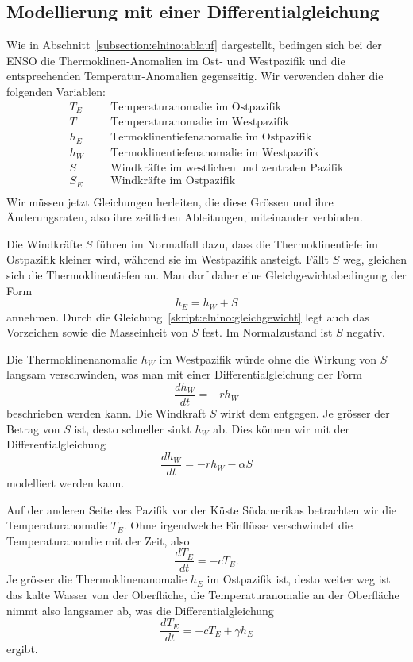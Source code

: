 \subsection{Modellierung mit einer Differentialgleichung%
\label{subsection:elnino:modellierung}}
Wie in Abschnitt~\ref{subsection:elnino:ablauf} dargestellt, bedingen sich
bei der ENSO die Thermoklinen-Anomalien im Ost- und Westpazifik und die
entsprechenden Temperatur-Anomalien gegenseitig.
Wir verwenden daher die folgenden Variablen:
\[
\begin{aligned}
T_E&&&\text{Temperaturanomalie im Ostpazifik}\\
T&&&\text{Temperaturanomalie im Westpazifik}\\
h_E&&&\text{Termoklinentiefenanomalie im Ostpazifik}\\
h_W&&&\text{Termoklinentiefenanomalie im Westpazifik}\\
S&&&\text{Windkräfte im westlichen und zentralen Pazifik}\\
S_E&&&\text{Windkräfte im Ostpazifik}\\
\end{aligned}
\]
Wir müssen jetzt Gleichungen herleiten, die diese Grössen und ihre
Änderungsraten, also ihre zeitlichen Ableitungen, miteinander verbinden.

Die Windkräfte $S$ führen im Normalfall dazu, dass die Thermoklinentiefe
im Ostpazifik kleiner wird, während sie im Westpazifik ansteigt.
Fällt $S$ weg, gleichen sich die Thermoklinentiefen an.
Man darf daher eine Gleichgewichtsbedingung der Form
\begin{equation}
h_E = h_W + S
\label{skript:elnino:gleichgewicht}
\end{equation}
annehmen.
Durch die Gleichung~\ref{skript:elnino:gleichgewicht} legt auch
das Vorzeichen sowie die Masseinheit von $S$ fest.
Im Normalzustand ist $S$ negativ.

Die Thermoklinenanomalie $h_W$ im Westpazifik würde ohne die Wirkung
von $S$ langsam verschwinden, was man mit einer Differentialgleichung
der Form
\[
\frac{dh_W}{dt} = -rh_W
\]
beschrieben werden kann.
Die Windkraft $S$ wirkt dem entgegen.
Je grösser der Betrag von $S$ ist, desto schneller sinkt $h_W$ ab.
Dies können wir mit der Differentialgleichung
\begin{equation}
\frac{dh_W}{dt}
=
-rh_W -\alpha S
\end{equation}
modelliert werden kann.

Auf der anderen Seite des Pazifik vor der Küste Südamerikas
betrachten wir die Temperaturanomalie
$T_E$.
Ohne irgendwelche Einflüsse verschwindet die Temperaturanomlie mit der
Zeit, also
\[
\frac{dT_E}{dt} = -cT_E.
\]
Je grösser die Thermoklinenanomalie $h_E$ im Ostpazifik ist, desto weiter
weg ist das kalte Wasser von der Oberfläche, die Temperaturanomalie an
der Oberfläche nimmt also langsamer ab, was die Differentialgleichung
\begin{equation}
\frac{dT_E}{dt} = -cT_E + \gamma h_E
\end{equation}
ergibt.

